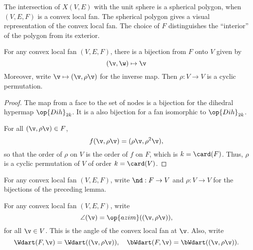 \begin{remark}[visualization]
The intersection of $X(V,E)$ with the unit sphere is a spherical
polygon, when $(V,E,F)$ is a convex local fan.  The spherical polygon gives
a visual representation of the convex local fan. The choice of $F$
distinguishes the ``interior'' of the polygon from its exterior. 
\end{remark}


\begin{lemma}[]  
For any convex local fan $(V,E,F)$, there is a bijection from $F$ onto $V$
given by
\begin{displaymath}
(\v,\w) \mapsto \v
\end{displaymath}
Moreover, write $\v\mapsto(\v,\rho\v)$ for the inverse map. 
Then $\rho:V\to V$ is a cyclic permutation.
\end{lemma}
%

\begin{proof} The map from a face to the set of nodes is a bijection
for the dihedral hypermap $\op{Dih}_{2k}$. It is a also bijection for a fan isomorphic
to $\op{Dih}_{2k}$.

For all $(\v,\rho \v)\in F$,
\begin{displaymath}
f(\v,\rho \v) = (\rho\v,\rho^2\v),
\end{displaymath}
so that the order of $\rho$ on $V$ is the order of $f$ on $F$, which
is $k=\card(F)$.  Thus, $\rho$ is a cyclic permutation of $V$ of order
$k=\card(V)$.
\end{proof}

\begin{definition}[$\rho$,~$\v$] 
For any convex local fan $(V,E,F)$, write
$\nd:F\to V$ and $\rho:V\to V$ for the bijections of the preceding
lemma.
\end{definition}
%
%

\begin{definition}
For any convex local fan $(V,E,F)$,
write
\begin{displaymath}
\angle(\v) = \op{azim}((\v,\rho\v)),
\end{displaymath}
for all $\v\in V$.  This is the  angle of the convex local fan at $\v$.  Also, write
\begin{displaymath}
  \Wdart(F,\v) = \Wdart((\v,\rho \v)),\quad 
\bWdart(F,\v) =\bWdart((\v,\rho \v)).
\end{displaymath}
%
%
%
\end{definition}


